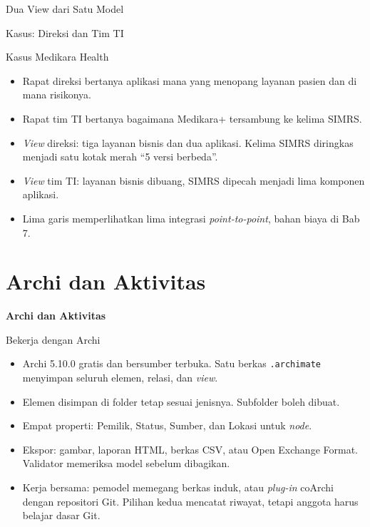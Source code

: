 \documentclass[aspectratio=169, table, 12pt]{beamer}
\begin{document}
\begin{frame}{{\Large Dua View dari Satu Model}}
  \centering
\end{frame}

\begin{frame}{{\Large Kasus: Direksi dan Tim TI}}
  \begin{block}{Kasus Medikara Health}
    \small
    \begin{itemize}
      \item Rapat direksi bertanya aplikasi mana yang menopang layanan pasien dan di mana risikonya.
      \item Rapat tim TI bertanya bagaimana Medikara+ tersambung ke kelima SIMRS.
      \item \textit{View} direksi: tiga layanan bisnis dan dua aplikasi. Kelima SIMRS diringkas menjadi
            satu kotak merah ``5 versi berbeda''.
      \item \textit{View} tim TI: layanan bisnis dibuang, SIMRS dipecah menjadi lima komponen aplikasi.
      \item Lima garis memperlihatkan lima integrasi \textit{point-to-point}, bahan biaya di Bab 7.
    \end{itemize}
  \end{block}
\end{frame}

\section{Archi dan Aktivitas}

\begin{frame}{\hfill}
  \centering
  \Huge{\textbf{Archi dan Aktivitas}}
\end{frame}

\begin{frame}{{\Large Bekerja dengan Archi}}
  \small
  \begin{itemize}
    \item Archi 5.10.0 gratis dan bersumber terbuka. Satu berkas \texttt{.archimate} menyimpan seluruh
          elemen, relasi, dan \textit{view}.
    \item Elemen disimpan di folder tetap sesuai jenisnya. Subfolder boleh dibuat.
    \item Empat properti: Pemilik, Status, Sumber, dan Lokasi untuk \textit{node}.
    \item Ekspor: gambar, laporan HTML, berkas CSV, atau Open Exchange Format. Validator memeriksa model
          sebelum dibagikan.
    \item Kerja bersama: pemodel memegang berkas induk, atau \textit{plug-in} coArchi dengan repositori
          Git. Pilihan kedua mencatat riwayat, tetapi anggota harus belajar dasar Git.
  \end{itemize}
\end{frame}
\end{document}
